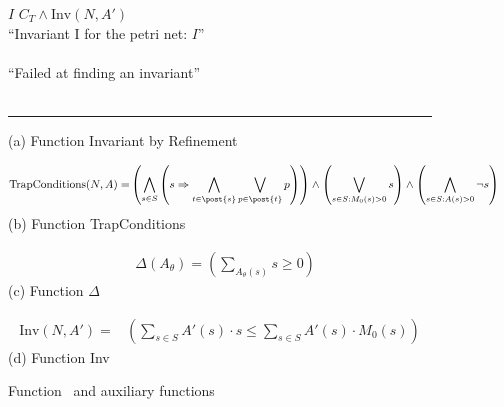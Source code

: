 \begin{figure}
\begin{minipage}[t]{.94\columnwidth}
    \tabTT $I$ \algAssgn $C_T \land \text{Inv}(N, A')$ \\
    \tabTT \algReturn ``Invariant I for the petri net: $I$'' \\
    \tabT \algElse \\
    \tabTT \algReturn ``Failed at finding an invariant'' \\
    \tabT \algFi \\
    \algEnd
  \end{minipage}
  \vspace{1.5ex}
  \hrule
  \vspace{1.5ex}
  (a) Function Invariant by Refinement
  \vspace{2.5ex}
  \begin{minipage}{\columnwidth}
    \centering
    \begin{align*}
      \text{TrapConditions}(N, A) =& \left(
        \bigwedge_{s \in S} \left( s \Rightarrow
          \bigwedge_{t \in \post{s}} \bigvee_{p \in \post{t}} p
        \right) \right) \land
      \left( \bigvee_{s \in S: M_0(s) > 0} s \right) \land
      \left( \bigwedge_{s \in S: A(s) > 0} \neg s \right)
    \end{align*}
    \vspace{1.5ex}
    (b) Function TrapConditions
  \end{minipage}
  \vspace{2.5ex}
  \begin{minipage}{.4\columnwidth}
    \centering
    \begin{align*}
      & \Delta(A_\theta) = \left( \sum_{A_\theta(s)} s \ge 0 \right)
    \end{align*}
    \vspace{1.5ex}
    (c) Function $\Delta$
  \end{minipage}
  \begin{minipage}{.4\columnwidth}
    \centering
    \begin{align*}
      \text{Inv}(N, A') =& \left( \sum_{s \in S} A'(s) \cdot s \le
        \sum_{s \in S} A'(s) \cdot M_0(s) \right)
    \end{align*}
    \vspace{1.5ex}
    (d) Function Inv
  \end{minipage}
  \caption{Function \invariantref\ and auxiliary functions}
  \label{fig_function_invariant_by_refinement_pseudocode}
\end{figure}

